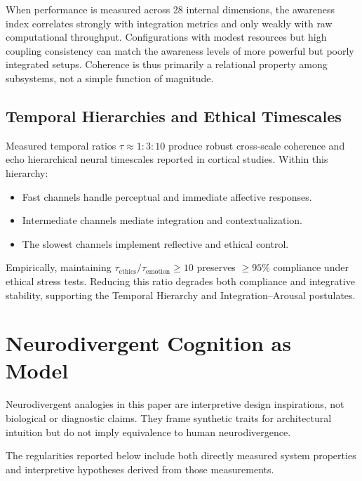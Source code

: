\documentclass[11pt,a4paper]{article}
\begin{document}
When performance is measured across 28 internal dimensions, the awareness index correlates strongly with integration metrics and only weakly with raw computational throughput. Configurations with modest resources but high coupling consistency can match the awareness levels of more powerful but poorly integrated setups. Coherence is thus primarily a relational property among subsystems, not a simple function of magnitude.

\subsection{Temporal Hierarchies and Ethical Timescales}

Measured temporal ratios \( \tau \approx 1:3:10 \) produce robust cross-scale coherence and echo hierarchical neural timescales reported in cortical studies. Within this hierarchy:
\begin{itemize}[leftmargin=2em]
    \item Fast channels handle perceptual and immediate affective responses.
    \item Intermediate channels mediate integration and contextualization.
    \item The slowest channels implement reflective and ethical control.
\end{itemize}
Empirically, maintaining \( \tau_{\text{ethics}}/\tau_{\text{emotion}} \ge 10 \) preserves \( \ge 95\% \) compliance under ethical stress tests. Reducing this ratio degrades both compliance and integrative stability, supporting the Temporal Hierarchy and Integration--Arousal postulates.

\section{Neurodivergent Cognition as Model}
\label{sec:neurodivergent}

\begin{tcolorbox}[colback=gray!10, colframe=gray!50, title=Neurodivergence Framing Disclaimer]
Neurodivergent analogies in this paper are interpretive design inspirations, not biological or diagnostic claims. They frame synthetic traits for architectural intuition but do not imply equivalence to human neurodivergence.
\end{tcolorbox}

The regularities reported below include both directly measured system properties and interpretive hypotheses derived from those measurements.
\end{document}
